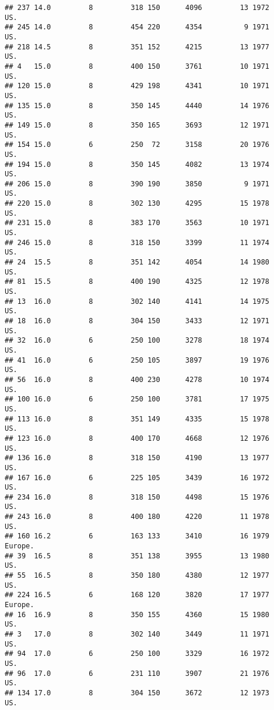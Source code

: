 \documentclass[11pt,]{article}
\begin{document}
\begin{verbatim}
## 237 14.0         8         318 150      4096         13 1972      US.
## 245 14.0         8         454 220      4354          9 1971      US.
## 218 14.5         8         351 152      4215         13 1977      US.
## 4   15.0         8         400 150      3761         10 1971      US.
## 120 15.0         8         429 198      4341         10 1971      US.
## 135 15.0         8         350 145      4440         14 1976      US.
## 149 15.0         8         350 165      3693         12 1971      US.
## 154 15.0         6         250  72      3158         20 1976      US.
## 194 15.0         8         350 145      4082         13 1974      US.
## 206 15.0         8         390 190      3850          9 1971      US.
## 220 15.0         8         302 130      4295         15 1978      US.
## 231 15.0         8         383 170      3563         10 1971      US.
## 246 15.0         8         318 150      3399         11 1974      US.
## 24  15.5         8         351 142      4054         14 1980      US.
## 81  15.5         8         400 190      4325         12 1978      US.
## 13  16.0         8         302 140      4141         14 1975      US.
## 18  16.0         8         304 150      3433         12 1971      US.
## 32  16.0         6         250 100      3278         18 1974      US.
## 41  16.0         6         250 105      3897         19 1976      US.
## 56  16.0         8         400 230      4278         10 1974      US.
## 100 16.0         6         250 100      3781         17 1975      US.
## 113 16.0         8         351 149      4335         15 1978      US.
## 123 16.0         8         400 170      4668         12 1976      US.
## 136 16.0         8         318 150      4190         13 1977      US.
## 167 16.0         6         225 105      3439         16 1972      US.
## 234 16.0         8         318 150      4498         15 1976      US.
## 243 16.0         8         400 180      4220         11 1978      US.
## 160 16.2         6         163 133      3410         16 1979  Europe.
## 39  16.5         8         351 138      3955         13 1980      US.
## 55  16.5         8         350 180      4380         12 1977      US.
## 224 16.5         6         168 120      3820         17 1977  Europe.
## 16  16.9         8         350 155      4360         15 1980      US.
## 3   17.0         8         302 140      3449         11 1971      US.
## 94  17.0         6         250 100      3329         16 1972      US.
## 96  17.0         6         231 110      3907         21 1976      US.
## 134 17.0         8         304 150      3672         12 1973      US.

\end{verbatim}
\end{document}
